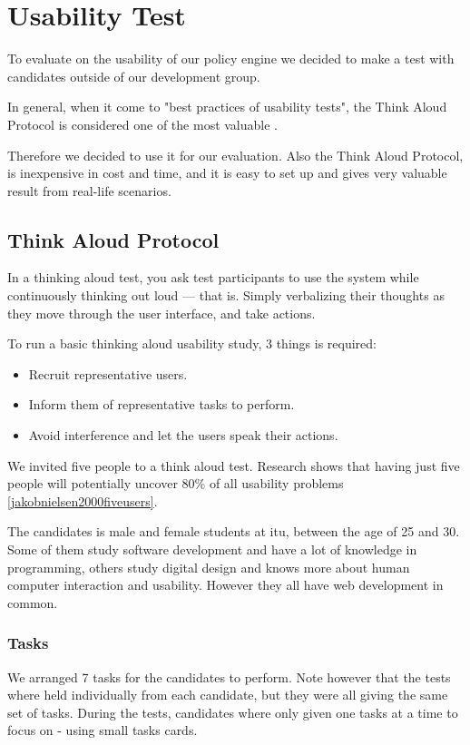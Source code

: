 \section{Usability Test}
\label{sec:usability-test}
To evaluate on the usability of our policy engine we decided to make a test with candidates outside of our development group.

In general, when it come to "best practices of usability tests", the Think Aloud Protocol is considered one of the most valuable \cite{Nielsen1993}.

Therefore we decided to use it for our evaluation. Also the Think Aloud Protocol, is inexpensive in cost and time, and it is easy to set up and gives very valuable result from real-life scenarios. 

\subsection{Think Aloud Protocol}
In a thinking aloud test, you ask test participants to use the system while continuously thinking out loud — that is. Simply verbalizing their thoughts as they move through the user interface, and take actions.

To run a basic thinking aloud usability study, 3 things is required:
\begin{itemize}
\item Recruit representative users.
\item Inform them of representative tasks to perform. %
\item Avoid interference and let the users speak their actions.
\end{itemize}

We invited five people to a think aloud test. Research shows that having just five people will potentially uncover 80\% of all usability problems \ref{jakobnielsen2000fiveusers}.

The candidates is male and female students at itu, between the age of 25 and 30. Some of them study software development and have a lot of knowledge in programming, others study digital design and knows more about human computer interaction and usability. However they all have web development in common.

\subsubsection{Tasks}
We arranged 7 tasks for the candidates to perform.  Note however that the tests where held individually from each candidate, but they were all giving the same set of tasks. 
During the tests, candidates where only given one tasks at a time to focus on - using small tasks cards.

